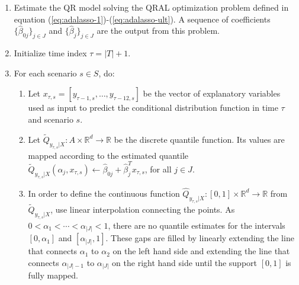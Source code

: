 \begin{enumerate}
	
	\item Estimate the QR model solving the QRAL optimization problem defined in equation (\ref{eq:adalasso-1})-(\ref{eq:adalasso-ult}). 
	A sequence of coefficients $\{ \hat\beta_{0j} \}_{j \in J}$ and $\{ \hat\beta_{j} \}_{j \in J}$ are the output from this problem. 

	\item Initialize time index $\tau = |T| + 1$.
	
	\item For each scenario $s \in S$, do:
		\begin{enumerate}

		\item Let $x_{\tau,s} = [y_{\tau-1,s}, \dots, y_{\tau-12,s}]$ be the vector of explanatory variables used as input to predict the conditional distribution function in time $\tau$ and scenario $s$.

		\item Let $\tilde{Q}_{y_{\tau,s}|X}:A \times \mathbb{R}^d \rightarrow \mathbb{R}$ be the discrete quantile function. Its values are mapped according to the estimated quantile $\tilde Q_{y_{\tau,s}|X}(\alpha_j, x_{\tau,s}) \leftarrow \hat\beta_{0j} + \hat\beta_j^T x_{\tau,s}$, for all $j \in J$.
		
		\item In order to define the continuous function $\hat{Q}_{y_{\tau,s}|X}:[0,1] \times \mathbb{R}^d \rightarrow \mathbb{R}$ from $\tilde Q_{y_{\tau,s}|X}$, use linear interpolation connecting the points. As $0 < \alpha_1 < \cdots < \alpha_{|J|} < 1$, there are no quantile estimates for the intervals $[0,\alpha_1]$ and $[\alpha_{|J|},1]$. These gaps are filled by linearly extending the line that connects $\alpha_1$ to $\alpha_2$ on the left hand side and extending the line that connects $\alpha_{|J|-1}$ to $\alpha_{|J|}$ on the right hand side until the support $[0,1]$ is fully mapped.  

		
		

\end{enumerate}
\end{enumerate}
